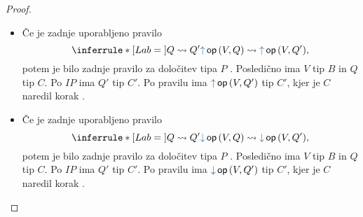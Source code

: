 \begin{proof}
\begin{itemize}
		\item Če je zadnje uporabljeno pravilo
		$$
		\coopinfer{}{
			Q \reduces Q'
		}{
			\tmopout{op}{V}{Q}  \reduces \tmopout{op}{V}{Q'}
		},$$
		potem je bilo zadnje pravilo za določitev tipa $P$ .
		Posledično ima $V$ tip $B$ in $Q$ tip $C$.
		Po $IP$ ima $Q'$ tip $C'$.
		Po pravilu  ima $\tmopout{op}{V}{Q'}$ tip $C'$, kjer je $C$ naredil korak .
		
		\item Če je zadnje uporabljeno pravilo
		$$
		\coopinfer{}{
			Q \reduces Q'
		}{
			\tmopin{op}{V}{Q}  \reduces \tmopin{op}{V}{Q'}
		},$$
		potem je bilo zadnje pravilo za določitev tipa $P$ .
		Posledično ima $V$ tip $B$ in $Q$ tip $C$.
		Po $IP$ ima $Q'$ tip $C'$.
		Po pravilu  ima $\tmopin{op}{V}{Q'}$ tip $C'$, kjer je $C$ naredil korak .
	\end{itemize}

\end{proof}


